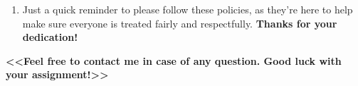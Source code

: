 \begin{mdframed}[style=MyFrame,nobreak=true,align=center,userdefinedwidth=40em,backgroundcolor=blue!20]
\begin{enumerate}
		\item Just a quick reminder to please follow these policies, as they're here to help make sure everyone is treated fairly and respectfully. \textbf{Thanks for your dedication!}
	\end{enumerate}
\centering\textbf{<<Feel free to contact me in case of any question. Good luck with your assignment!>>}
    \end{mdframed}
        
    


